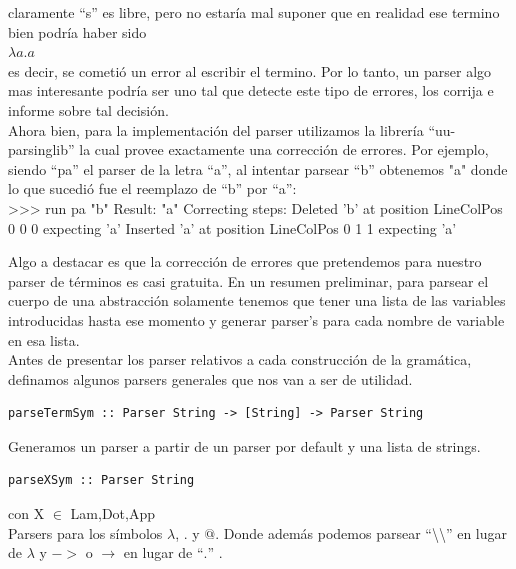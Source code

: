 \documentclass[a4paper,10pt]{article}
\newenvironment{code}{\footnotesize\verbatim}{\endverbatim\normalsize}
\begin{document}
claramente ``s'' es libre, pero no estaría mal suponer que en realidad ese termino
bien podría haber sido\\

$\lambda a . a$\\

es decir, se cometió un error al escribir el termino. Por lo tanto, un parser
algo mas interesante podría ser uno tal que detecte este tipo de errores, los
corrija e informe sobre tal decisión.\\

Ahora bien, para la implementación del parser utilizamos la librería ``uu-parsinglib''
la cual provee exactamente una corrección de errores. Por ejemplo, siendo ``pa''
el parser de la letra ``a'', al intentar parsear ``b'' obtenemos "a" donde lo que
sucedió fue el reemplazo de ``b'' por ``a'':\\

\begin{code}
 >>> run pa  "b"
     Result: "a"
     Correcting steps: 
       Deleted   'b' at position LineColPos 0 0 0 expecting 'a'
       Inserted  'a' at position LineColPos 0 1 1 expecting 'a'
\end{code}

Algo a destacar es que la corrección de errores que pretendemos para nuestro
parser de términos es casi gratuita. En un resumen preliminar, para parsear el
cuerpo de una abstracción solamente tenemos que tener una lista de las variables
introducidas hasta ese momento y generar parser's para cada nombre de variable
en esa lista.\\

Antes de presentar los parser relativos a cada construcción de la gramática,
definamos algunos parsers generales que nos van a ser de utilidad.

\begin{lstlisting}
parseTermSym :: Parser String -> [String] -> Parser String
\end{lstlisting}
Generamos un parser a partir de un parser por default y una lista de strings.

\begin{lstlisting}
parseXSym :: Parser String
\end{lstlisting} con X $\in$ {Lam,Dot,App}\\

Parsers para los símbolos $\lambda$, $.$ y $@$. Donde además podemos parsear 
``\textbackslash \textbackslash'' en lugar de $\lambda$ y $->$ o $\rightarrow$
en lugar de ``$.$'' .
\end{document}
